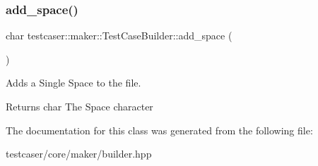 \subsubsection{\texorpdfstring{add\_space()}{add\_space()}}
{\footnotesize\ttfamily char testcaser\+::maker\+::\+Test\+Case\+Builder\+::add\+\_\+space (\begin{DoxyParamCaption}{ }\end{DoxyParamCaption})\hspace{0.3cm}{\ttfamily [inline]}}



Adds a Single Space to the file. 

\begin{DoxyReturn}{Returns}
char The Space character 
\end{DoxyReturn}


The documentation for this class was generated from the following file\+:\begin{DoxyCompactItemize}
\item 
testcaser/core/maker/builder.\+hpp\end{DoxyCompactItemize}
